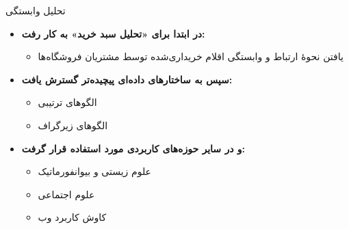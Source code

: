 \begin{frame}{تحلیل وابستگی}{}
\begin{itemize}\setlength{\itemsep}{7pt}
    \item \textbf{در ابتدا برای «تحلیل سبد خرید»  به کار رفت:}
    \begin{itemize}\setlength{\itemsep}{3pt}
        \item یافتن نحوهٔ ارتباط و وابستگی اقلام خریداری‌شده توسط مشتریان فروشگاه‌ها
    \end{itemize}
    \item \textbf{سپس به ساختارهای داده‌ای پیچیده‌تر گسترش یافت:}
    \begin{itemize}\setlength{\itemsep}{3pt}
        \item الگوهای ترتیبی 
        \item الگوهای زیرگراف 
    \end{itemize}
    \item \textbf{و در سایر حوزه‌های کاربردی مورد استفاده قرار گرفت:}
    \begin{itemize}\setlength{\itemsep}{3pt}
        \item علوم زیستی و بیوانفورماتیک 
        \item علوم اجتماعی 
        \item کاوش کاربرد وب 
    \end{itemize}
\end{itemize}
\end{frame}

